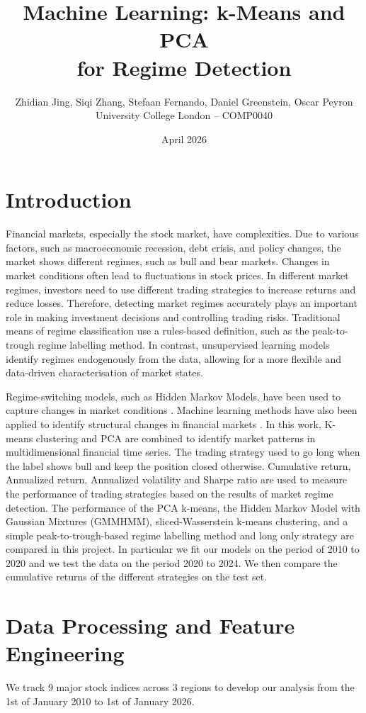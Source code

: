 \documentclass[11pt, a4paper]{article}
\title{\vspace{-1.5em}\textbf{Machine Learning: k-Means and PCA\\[3pt] for Regime Detection}\vspace{-0.5em}}
\author{Zhidian Jing, Siqi Zhang, Stefaan Fernando, Daniel Greenstein, Oscar Peyron\\[2pt]
\small University College London \quad -- \quad COMP0040}
\date{April 2026}
\begin{document}
\maketitle
\thispagestyle{fancy}
\vspace{-1em}
\section{Introduction}
Financial markets, especially the stock market, have complexities. Due to various factors, such as macroeconomic recession, debt crisis, and policy changes, the market shows different regimes, such as bull and bear markets. Changes in market conditions often lead to fluctuations in stock prices. In different market regimes, investors need to use different trading strategies to increase returns and reduce losses. Therefore, detecting market regimes accurately plays an important role in making investment decisions and controlling trading risks. Traditional means of regime classification use a rules-based definition, such as the peak-to-trough regime labelling method. In contrast, unsupervised learning models identify regimes endogenously from the data, allowing for a more flexible and data-driven characterisation of market states.

Regime-switching models, such as Hidden Markov Models, have been used to capture changes in market conditions \cite{gupta2025}. Machine learning methods have also been applied to identify structural changes in financial markets \cite{mustafa2022}. In this work, K-means clustering and PCA are combined to identify market patterns in multidimensional financial time series. The trading strategy used to go long when the label shows bull and keep the position closed otherwise. Cumulative return, Annualized return, Annualized volatility and Sharpe ratio are used to measure the performance of trading strategies based on the results of market regime detection. The performance of the PCA k-means, the Hidden Markov Model with Gaussian Mixtures (GMMHMM), sliced-Wasserstein k-means clustering, and a simple peak-to-trough-based regime labelling method and long only strategy are compared in this project.
In particular we fit our models on the period of 2010 to 2020 and we test the data on the period 2020 to 2024. We then compare the cumulative returns of the different strategies on the test set.

\section{Data Processing and Feature Engineering}
We track 9 major stock indices across 3 regions to develop our analysis from the 1st of January 2010 to 1st of January 2026.
\end{document}
